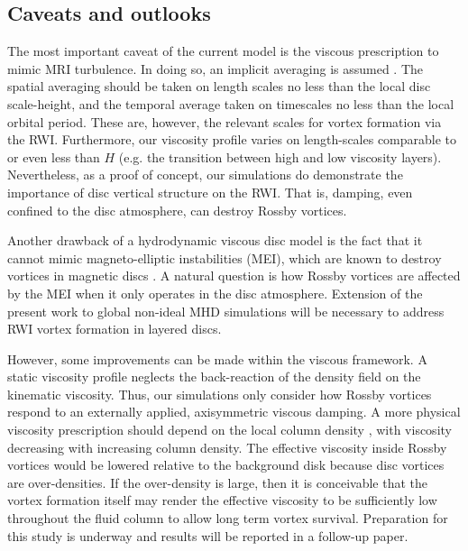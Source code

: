 \subsection{Caveats and outlooks}\label{caveats}

The most important caveat of the current model is the viscous
prescription to mimic MRI turbulence. In doing so, an implicit
averaging is assumed \citep{balbus99}. The spatial averaging should be
taken on length scales no less than the local disc scale-height, and
the temporal average taken on timescales no less than the local
orbital period. These are, however, the relevant scales for vortex
formation via the RWI. Furthermore, our viscosity profile varies on
length-scales comparable to or even less than $H$ (e.g. the transition
between high and low viscosity layers). Nevertheless, as a proof of
concept, our simulations do demonstrate %
the importance of disc vertical structure on the RWI. That is, damping,
even confined to the disc atmosphere, can destroy Rossby vortices. 

Another drawback of a hydrodynamic viscous disc model is the
fact that it cannot mimic magneto-elliptic instabilities (MEI), which
are known to destroy vortices in magnetic discs
\citep{lyra11,mizerski12}. A natural question is how 
Rossby vortices are affected by the MEI when it only operates in
the disc atmosphere. Extension of the present work to global non-ideal
MHD simulations will be necessary to address RWI vortex formation in
layered discs.   

However, some improvements can be made within the viscous
framework. A static viscosity profile neglects the
back-reaction of the density field on the kinematic viscosity. Thus,
our simulations only consider how Rossby vortices 
respond to an externally applied, axisymmetric viscous damping. A more
physical viscosity prescription should depend on the local column density
\citep{fleming03}, with viscosity decreasing with increasing column
density. The effective viscosity inside Rossby vortices would be
lowered relative to the background disk because disc vortices are
over-densities. If the over-density is large, then it is
conceivable that the vortex formation itself may render the effective
viscosity to be sufficiently low throughout the fluid column to allow
long term vortex survival.    
Preparation for this study is underway and results will be reported in
a follow-up paper. 
